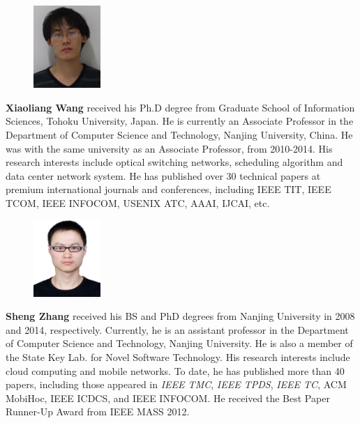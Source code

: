 \documentclass[review]{elsarticle}
\begin{document}
\begin{figure}
	\includegraphics[width=1.0in]{Wang-photo.png}
\end{figure}
\textbf{Xiaoliang Wang} received his Ph.D degree from Graduate School of Information Sciences, Tohoku University, Japan. He is currently an Associate Professor in the Department of Computer Science and Technology, Nanjing University, China. He was with the same university as an Associate Professor, from 2010-2014. His research interests include optical switching networks, scheduling algorithm and data center network system.  He has published over 30 technical papers at premium international journals and conferences, including IEEE TIT, IEEE TCOM, IEEE INFOCOM, USENIX ATC, AAAI, IJCAI, etc.



\begin{figure} 
	\includegraphics[width=1.0in]{sheng.eps}	

\end{figure} 
\textbf{Sheng Zhang} received his BS and PhD degrees from Nanjing University in 2008 and 2014, respectively. Currently, he is an assistant professor in the Department of Computer Science and Technology, Nanjing University. He is also a member of the State Key Lab. for Novel Software Technology. His research interests include cloud computing and mobile networks. To date, he has published more than 40 papers, including those appeared in \emph{IEEE TMC}, \emph{IEEE TPDS}, \emph{IEEE TC}, ACM MobiHoc, IEEE ICDCS, and IEEE INFOCOM. He received the Best Paper Runner-Up Award from IEEE MASS 2012.
\end{document}
